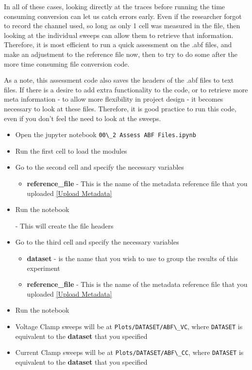 \documentclass{article}
\begin{document}
In all of these cases, looking directly at the traces before running the time consuming conversion can let us catch errors early. Even if the researcher forgot to record the channel used, so long as only 1 cell was measured in the file, then looking at the individual sweeps can allow them to retrieve that information. Therefore, it is most efficient to run a quick assessment on the .abf files, and make an adjustment to the reference file now, then to try to do some after the more time consuming file conversion code.

As a note, this assessment code also saves the headers of the .abf files to text files. If there is a desire to add extra functionality to the code, or to retrieve more meta information - to allow more flexibility in project design - it becomes necessary to look at these files. Therefore, it is good practice to run this code, even if you don't feel the need to look at the sweeps.

\begin{itemize}
    \item Open the jupyter notebook \verb|00\_2 Assess ABF Files.ipynb|
    
    \item Run the first cell to load the modules
    
    \item Go to the second cell and specify the necessary variables
    
    \begin{itemize}
        \item \textbf{reference\_file} - This is the name of the metadata reference file that you uploaded \ref{Upload Metadata}
    \end{itemize}
    
    \item Run the notebook
    
    - This will create the file headers
    
    \item Go to the third cell and specify the necessary variables
    
    \begin{itemize}
        \item \textbf{dataset} - is the name that you wish to use to group the results of this experiment
        
        \item \textbf{reference\_file} - This is the name of the metadata reference file that you uploaded \ref{Upload Metadata}
    \end{itemize}
    
    \item Run the notebook
    
    \item Voltage Clamp sweeps will be at \verb|Plots/DATASET/ABF\_VC|, where \verb|DATASET| is equivalent to the  \textbf{dataset} that you specified
    
    \item Current Clamp sweeps will be at \verb|Plots/DATASET/ABF\_CC|, where \verb|DATASET| is equivalent to the \textbf{dataset} that you specified
\end{itemize}
\end{document}
